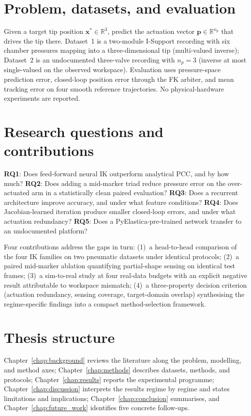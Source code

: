\section{Problem, datasets, and evaluation}
\label{sec:intro_problem}

Given a target tip position $\mathbf{x}^{\ast} \in \mathbb{R}^{3}$, predict the actuation vector $\mathbf{p} \in \mathbb{R}^{n_{p}}$ that drives the tip there. Dataset~1 is a two-module I-Support recording \cite{manti2016soft, bianchi2023learning} with six chamber pressures mapping into a three-dimensional tip (multi-valued inverse); Dataset~2 is an undocumented three-valve recording with $n_{p} = 3$ (inverse at most single-valued on the observed workspace). Evaluation uses pressure-space prediction error, closed-loop position error through the FK arbiter, and mean tracking error on four smooth reference trajectories. No physical-hardware experiments are reported.

\section{Research questions and contributions}
\label{sec:intro_rqs}

\textbf{RQ1}: Does feed-forward neural IK outperform analytical PCC, and by how much? \textbf{RQ2}: Does adding a mid-marker triad reduce pressure error on the over-actuated arm in a statistically clean paired evaluation? \textbf{RQ3}: Does a recurrent architecture improve accuracy, and under what feature conditions? \textbf{RQ4}: Does Jacobian-learned iteration produce smaller closed-loop errors, and under what actuation redundancy? \textbf{RQ5}: Does a PyElastica-pre-trained network transfer to an undocumented platform?

Four contributions address the gaps in turn: (1)~a head-to-head comparison of the four IK families on two pneumatic datasets under identical protocols; (2)~a paired mid-marker ablation quantifying partial-shape sensing on identical test frames; (3)~a sim-to-real study at four real-data budgets with an explicit negative result attributable to workspace mismatch; (4)~a three-property decision criterion (actuation redundancy, sensing coverage, target-domain overlap) synthesising the regime-specific findings into a compact method-selection framework.

\section{Thesis structure}
\label{sec:intro_structure}

Chapter~\ref{chap:background} reviews the literature along the problem, modelling, and method axes; Chapter~\ref{chap:methods} describes datasets, methods, and protocols; Chapter~\ref{chap:results} reports the experimental programme; Chapter~\ref{chap:discussion} interprets the results regime by regime and states limitations and implications; Chapter~\ref{chap:conclusion} summarises, and Chapter~\ref{chap:future_work} identifies five concrete follow-ups.
